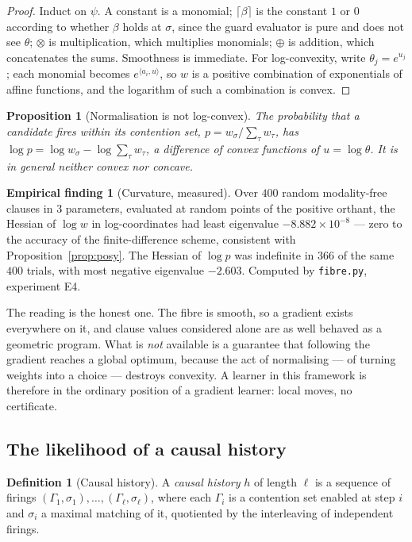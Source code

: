 \documentclass[11pt,a4paper]{article}
\theoremstyle{plain}
\newtheorem{proposition}[theorem]{Proposition}
\theoremstyle{definition}
\newtheorem{definition}[theorem]{Definition}
\newtheorem{finding}[theorem]{Empirical finding}
\theoremstyle{remark}
\newcommand{\tensorv}{\otimes}
\newcommand{\sumv}{\oplus}
\newcommand{\crisp}[1]{\lceil #1 \rceil}
\begin{document}
\begin{proof}
Induct on $\psi$. A constant is a monomial; $\crisp{\beta}$ is the constant $1$ or
$0$ according to whether $\beta$ holds at $\sigma$, since the guard evaluator is
pure and does not see $\theta$; $\tensorv$ is multiplication, which multiplies
monomials; $\sumv$ is addition, which concatenates the sums. Smoothness is
immediate. For log-convexity, write $\theta_j = e^{u_j}$; each monomial becomes
$e^{\langle a_i, u\rangle}$, so $w$ is a positive combination of exponentials of
affine functions, and the logarithm of such a combination is convex.
\end{proof}

\begin{proposition}[Normalisation is not log-convex]\label{prop:signomial}
The probability that a candidate fires within its contention set,
$p = w_\sigma / \sum_{\tau} w_\tau$, has $\log p = \log w_\sigma -
\log \sum_\tau w_\tau$, a difference of convex functions of $u = \log\theta$. It
is in general neither convex nor concave.
\end{proposition}

\begin{finding}[Curvature, measured]\label{find:curvature}
Over $400$ random modality-free clauses in $3$ parameters, evaluated at random
points of the positive orthant, the Hessian of $\log w$ in log-coordinates had
least eigenvalue $-8.882\times10^{-8}$ --- zero to the accuracy of the
finite-difference scheme, consistent with Proposition~\ref{prop:posy}. The
Hessian of $\log p$ was indefinite in $366$ of the same $400$ trials, with most
negative eigenvalue $-2.603$. Computed by \texttt{fibre.py}, experiment E4.
\end{finding}

The reading is the honest one. The fibre is smooth, so a gradient exists
everywhere on it, and clause values considered alone are as well behaved as a
geometric program. What is \emph{not} available is a guarantee that following the
gradient reaches a global optimum, because the act of normalising --- of turning
weights into a choice --- destroys convexity. A learner in this framework is
therefore in the ordinary position of a gradient learner: local moves, no
certificate.

\subsection{The likelihood of a causal history}

\begin{definition}[Causal history]\label{def:history}
A \emph{causal history} $h$ of length $\ell$ is a sequence of firings
$(\Gamma_1,\sigma_1),\dots,(\Gamma_\ell,\sigma_\ell)$, where each $\Gamma_i$ is a
contention set enabled at step $i$ and $\sigma_i$ a maximal matching of it,
quotiented by the interleaving of independent firings.
\end{definition}
\end{document}
